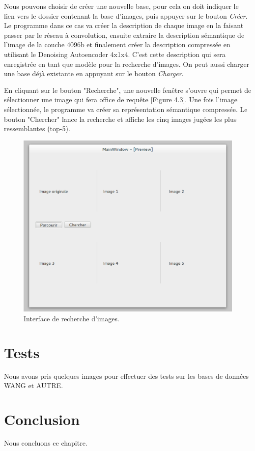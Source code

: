 	Nous pouvons choisir de créer une nouvelle base, pour cela on doit indiquer le lien vers le dossier contenant la base d'images, puis appuyer sur le bouton \textit{Créer}. Le programme dans ce cas va créer la description de chaque image en la faisant passer par le réseau à convolution, ensuite extraire la description sémantique de l'image de la couche 4096b et finalement créer la description compressée en utilisant le Denoising Autoencoder 4x1x4.
	C'est cette description qui sera enregistrée en tant que modèle pour la recherche d'images. On peut aussi charger une base déjà existante en appuyant sur le bouton \textit{Charger}.

	En cliquant sur le bouton "Recherche", une nouvelle fenêtre s'ouvre qui permet de sélectionner une image qui fera office de requête [Figure 4.3]. Une fois l'image sélectionnée, le programme va créer sa représentation sémantique compressée. Le bouton "Chercher" lance la recherche et affiche les cinq images jugées les plus ressemblantes (top-5).

\begin{figure}[H]
	\centering
		\includegraphics[width=5in]{Figures/search.png}
	\caption[]{Interface de recherche d'images.}
	\label{fig:Electron}
\end{figure}

\section{Tests}

Nous avons pris quelques images pour effectuer des tests sur les bases de données WANG et AUTRE.

\section{Conclusion}

Nous concluons ce chapitre.
